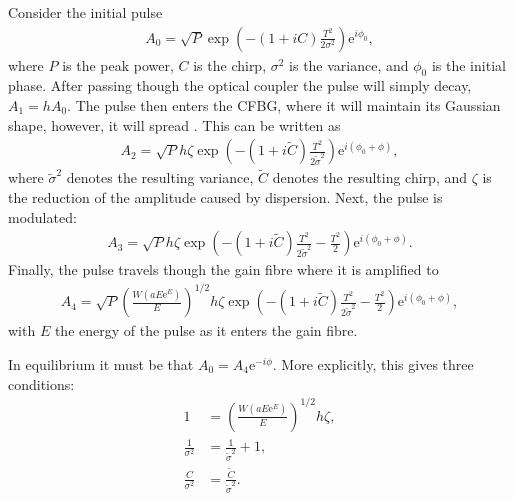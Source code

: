 Consider the initial pulse
\begin{align*}
	A_0 = \sqrt{P} \exp \left( -(1 + iC) \frac{T^2}{2 \sigma^2} \right) \textrm{e}^{i \phi_0},
\end{align*}
where $P$ is the peak power, $C$ is the chirp, $\sigma^2$ is the variance, and $\phi_0$ is the initial phase. After passing though the optical coupler the pulse will simply decay, $A_1 = h A_0$. The pulse then enters the CFBG, where it will maintain its Gaussian shape, however, it will spread \cite{agrawal2013}. This can be written as
\begin{align*}
A_2 = \sqrt{P} h \zeta \exp \left( -(1 + i \widetilde{C}) \frac{T^2}{2 \widetilde{\sigma}^2} \right) \textrm{e}^{i(\phi_0 + \phi)},
\end{align*}
where $\widetilde{\sigma}^2$ denotes the resulting variance, $\widetilde{C}$ denotes the resulting chirp, and $\zeta$ is the reduction of the amplitude caused by dispersion. Next, the pulse is modulated:
\begin{align*}
A_3 = \sqrt{P} h \zeta \exp \left( -(1 + i \widetilde{C}) \frac{T^2}{2 \widetilde{\sigma}^2} - \frac{T^2}{2} \right) \textrm{e}^{i(\phi_0 + \phi)}.
\end{align*}
Finally, the pulse travels though the gain fibre where it is amplified to
\begin{align*}
A_4 = \sqrt{P} \left( \frac{W(a E \textrm{e}^E)}{E} \right)^{1/2} h \zeta \exp \left( -(1 + i \widetilde{C}) \frac{T^2}{2 \widetilde{\sigma}^2} - \frac{T^2}{2} \right) \textrm{e}^{i(\phi_0 + \phi)},
\end{align*}
with $E$ the energy of the pulse as it enters the gain fibre.

In equilibrium it must be that $A_0 = A_4 \textrm{e}^{-i \phi}$. More explicitly, this gives three conditions:
\begin{subequations}
\begin{align}
\label{eq:energycond}
1 &= \left( \frac{W(a E \textrm{e}^E)}{E} \right)^{1/2} h \zeta, \\
\label{eq:varcond}
\frac{1}{\sigma^2} &= \frac{1}{\widetilde{\sigma}^2} + 1, \\
\label{eq:chirpcond}
\frac{C}{\sigma^2} &= \frac{\widetilde{C}}{\widetilde{\sigma}^2}.
\end{align}
\end{subequations}


